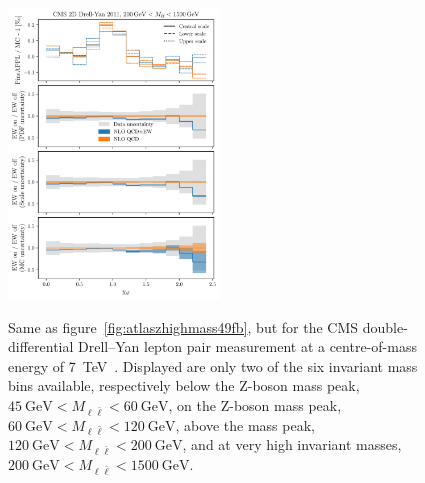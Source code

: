 \begin{figure}[!p]
    \includegraphics[width=0.5\textwidth]{figures/pineappl_CMSDY2D11_bin6}\\
    \caption{Same as figure~\ref{fig:atlaszhighmass49fb}, but for the CMS
      double-differential Drell--Yan lepton pair measurement at a
      centre-of-mass energy of \SI{7}{\tera\electronvolt}~\cite{Chatrchyan:2013tia}. Displayed are
      only two of the six invariant mass bins available, respectively below the
      Z-boson mass peak, $\SI{45}{\giga\electronvolt}<M_{\ell\bar\ell}<\SI{60}{\giga\electronvolt}$, on the Z-boson mass
      peak, $\SI{60}{\giga\electronvolt}<M_{\ell\bar\ell}<\SI{120}{\giga\electronvolt}$, above the mass peak,
      $\SI{120}{\giga\electronvolt}<M_{\ell\bar\ell}<\SI{200}{\giga\electronvolt}$, and at very high invariant masses,
      $\SI{200}{\giga\electronvolt}<M_{\ell\bar\ell}<\SI{1500}{\giga\electronvolt}$.}
    \label{fig:cmsdy2d11_bins3456}
\end{figure}

